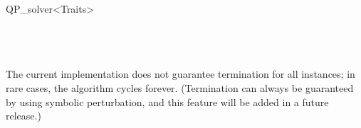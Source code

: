 \begin{ccRefClass}{QP_solver<Traits>}
\ccSeeAlso
%
    \\
    \\
    \\
    \\

\ccImplementation
\ccIndexImplementation

The current implementation does not guarantee termination for all
instances; in rare cases, the algorithm cycles forever.  (Termination
can always be guaranteed by using symbolic perturbation, and this
feature will be added in a future release.)

\ccExample
{}

\end{ccRefClass}


